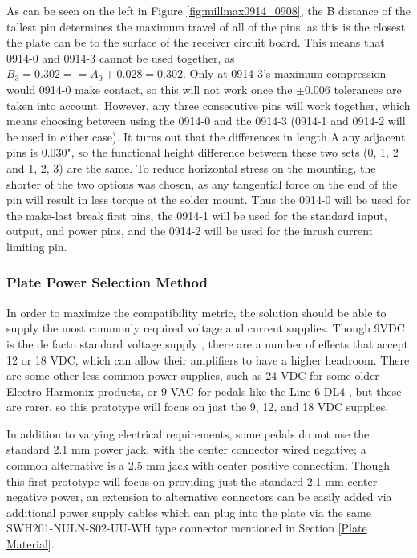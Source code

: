 \documentclass{article}
\begin{document}
		As can be seen on the left in Figure \ref{fig:millmax0914_0908}, the B distance of the tallest pin determines the maximum travel of all of the pins, as this is the closest the plate can be to the surface of the receiver circuit board.  This means that 0914-0 and 0914-3 cannot be used together, as $B_3 = 0.302 == A_0 + 0.028 = 0.302$.  Only at 0914-3's maximum compression would 0914-0 make contact, so this will not work once the $\pm 0.006$ tolerances are taken into account.  However, any three consecutive pins will work together, which means choosing between using the 0914-0 and the 0914-3 (0914-1 and 0914-2 will be used in either case).  It turns out that the differences in length A any adjacent pins is 0.030", so the functional height difference between these two sets ({0, 1, 2} and {1, 2, 3}) are the same.  To reduce horizontal stress on the mounting, the shorter of the two options was chosen, as any tangential force on the end of the pin will result in less torque at the solder mount.  Thus the 0914-0 will be used for the make-last break first pins, the 0914-1 will be used for the standard input, output, and power pins, and the 0914-2 will be used for the inrush current limiting pin.

		\subsubsection{Plate Power Selection Method}
		In order to maximize the compatibility metric, the solution should be able to supply the most commonly required voltage and current supplies.  Though 9VDC is the de facto standard voltage supply \cite{MyPedalData}, there are a number of effects that accept 12 or 18 VDC, which can allow their amplifiers to have a higher headroom.  There are some other less common power supplies, such as 24 VDC for some older Electro Harmonix products, or 9 VAC for pedals like the Line 6 DL4 \cite{Line6DL4manual}, but these are rarer, so this prototype will focus on just the 9, 12, and 18 VDC supplies.

		In addition to varying electrical requirements, some pedals do not use the standard 2.1 mm power jack, with the center connector wired negative; a common alternative is a 2.5 mm jack with center positive connection.  Though this first prototype will focus on providing just the standard 2.1 mm center negative power, an extension to alternative connectors can be easily added via additional power supply cables which can plug into the plate via the same SWH201-NULN-S02-UU-WH type connector mentioned in Section \ref{Plate Material}.
\end{document}
